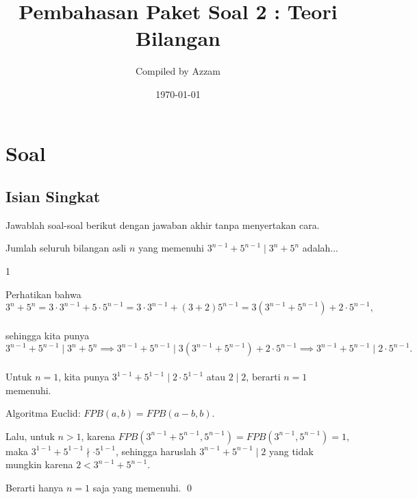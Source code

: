 \documentclass[12pt]{scrartcl}
\begin{document}
	\title{Pembahasan Paket Soal 2 : Teori Bilangan} %
	\date{\today}
	\author{Compiled by Azzam}
	\maketitle

\renewcommand*\contentsname{Daftar Isi}
\tableofcontents

\newpage
	\newpage
	
	\section{Soal}
\subsection{Isian Singkat}
Jawablah soal-soal berikut dengan jawaban akhir tanpa menyertakan cara.
	
	
	\begin{soalbaru}
		Jumlah seluruh bilangan asli $n$ yang memenuhi $3^{n-1}+5^{n-1} \mid 3^n + 5^{n}$ adalah...
		
		\begin{jawaban}
		1
		\end{jawaban}
		\begin{solusi}
		Perhatikan bahwa\\[-18pt]  $$3^n+5^n = 3\cdot3^{n-1}+5\cdot 5^{n-1} = 3\cdot 3^{n-1}+(3+2)5^{n-1} = 3(3^{n-1}+5^{n-1})+2\cdot 5^{n-1},$$\\[-25pt]sehingga kita punya \\[-15pt]$$3^{n-1}+5^{n-1} \mid 3^n + 5^{n} \implies 3^{n-1}+5^{n-1} \mid 3(3^{n-1}+5^{n-1})+2\cdot 5^{n-1} \implies 3^{n-1}+5^{n-1} \mid 2\cdot 5^{n-1}.$$\\[-20pt]
		Untuk $n=1$, kita punya $3^{1-1}+5^{1-1} \mid 2\cdot 5^{1-1}$ atau $2\mid 2$, berarti $n=1$ memenuhi.
		
		\begin{lemmarev}
		Algoritma Euclid: $FPB(a,b)=FPB(a-b,b).$
		\end{lemmarev}
		
		Lalu, untuk $n >1$, karena $FPB(3^{n-1}+5^{n-1},5^{n-1})=FPB(3^{n-1},5^{n-1})=1$, maka $3^{1-1}+5^{1-1} \nmid \cdot 5^{1-1}$, sehingga haruslah $3^{n-1}+5^{n-1} \mid 2$ yang tidak mungkin karena $2 < 3^{n-1}+5^{n-1}$.
		
		Berarti hanya $n=1$ saja yang memenuhi. \qed
		\end{solusi}
	\end{soalbaru}
	
\end{document}
